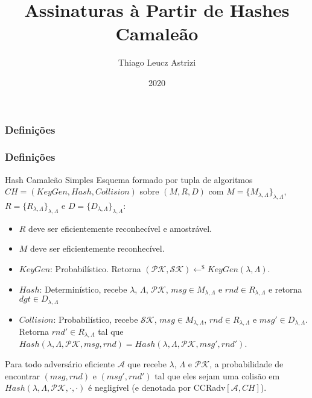 \documentclass{beamer}
\title{Assinaturas à Partir de Hashes Camaleão}
\author{Thiago Leucz Astrizi}
\institute{UFSC}
\date{2020}
\begin{document}
\frame{\titlepage}

\begin{frame}
\frametitle{Definições}

\begin{frame}
\frametitle{Definições}

\begin{block}{Hash Camaleão Simples}
    Esquema formado por tupla de algoritmos $CH=(KeyGen, Hash, Collision)$ sobre $(M, R, D)$ com $M=\{M_{\lambda,\Lambda}\}_{\lambda, \Lambda}$, $R=\{R_{\lambda,\Lambda}\}_{\lambda, \Lambda}$ e $D=\{D_{\lambda,\Lambda}\}_{\lambda, \Lambda}$:
    \begin{itemize}
    \item $R$ deve ser eficientemente reconhecível e amostrável.
    \item $M$ deve ser eficientemente reconhecível.
        \item $KeyGen$: Probabilístico. Retorna $(\mathcal{PK}, \mathcal{SK})\leftarrow^{\$}KeyGen(\lambda,\Lambda)$.
        \item $Hash$: Determinístico, recebe $\lambda$, $\Lambda$, $\mathcal{PK}$, $msg\in M_{\lambda,\Lambda}$ e $rnd\in R_{\lambda,\Lambda}$ e retorna $dgt \in D_{\lambda,\Lambda}$
        \item $Collision$: Probabilístico, recebe $\mathcal{SK}$, $msg \in M_{\lambda,\Lambda}$, $rnd \in R_{\lambda,\Lambda}$ e $msg' \in D_{\lambda,\Lambda}$. Retorna $rnd' \in R_{\lambda,\Lambda}$ tal que $Hash(\lambda,\Lambda,\mathcal{PK}, msg, rnd)=Hash(\lambda,\Lambda,\mathcal{PK}, msg', rnd')$.
    \end{itemize}
    Para todo adversário eficiente $\mathcal{A}$ que recebe $\lambda$, $\Lambda$ e $\mathcal{PK}$, a probabilidade de encontrar $(msg, rnd)$ e $(msg', rnd')$ tal que eles sejam uma colisão em $Hash(\lambda, \Lambda, \mathcal{PK}, \cdot, \cdot)$ é negligível (e denotada por CCRadv$[\mathcal{A}, CH]$).
    \end{block}
\end{frame}



\end{frame}
\end{document}
